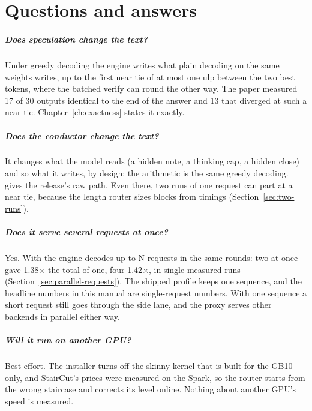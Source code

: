 \chapter{Questions and answers}\label{ch:faq}

\paragraph{Does speculation change the text?} Under greedy decoding the engine writes what plain decoding on the same weights writes, up to the first near tie of at most one ulp between the two best tokens, where the batched verify can round the other way. The paper measured 17 of 30 outputs identical to the end of the answer and 13 that diverged at such a near tie. Chapter~\ref{ch:exactness} states it exactly.

\paragraph{Does the conductor change the text?} It changes what the model reads (a hidden note, a thinking cap, a hidden close) and so what it writes, by design; the arithmetic is the same greedy decoding.  gives the release's raw path. Even there, two runs of one request can part at a near tie, because the length router sizes blocks from timings (Section~\ref{sec:two-runs}).

\paragraph{Does it serve several requests at once?} Yes. With  the engine decodes up to N requests in the same rounds: two at once gave 1.38$\times$ the total of one, four 1.42$\times$, in single measured runs (Section~\ref{sec:parallel-requests}). The shipped profile keeps one sequence, and the headline numbers in this manual are single-request numbers. With one sequence a short request still goes through the side lane, and the proxy serves other backends in parallel either way.

\paragraph{Will it run on another GPU?} Best effort. The installer turns off the skinny kernel that is built for the GB10 only, and StairCut's prices were measured on the Spark, so the router starts from the wrong staircase and corrects its level online. Nothing about another GPU's speed is measured.

